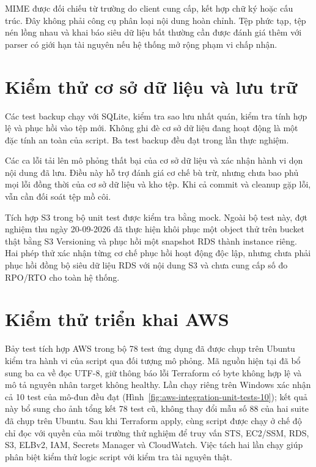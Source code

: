 MIME được đối chiếu từ trường do client cung cấp, kết hợp chữ ký hoặc cấu trúc. Đây không phải công cụ phân loại nội dung hoàn chỉnh. Tệp phức tạp, tệp nén lồng nhau và khai báo siêu dữ liệu bất thường cần được đánh giá thêm với parser có giới hạn tài nguyên nếu hệ thống mở rộng phạm vi chấp nhận.

\section{Kiểm thử cơ sở dữ liệu và lưu trữ}
Các test backup chạy với SQLite, kiểm tra sao lưu nhất quán, kiểm tra tính hợp lệ và phục hồi vào tệp mới. Không ghi đè cơ sở dữ liệu đang hoạt động là một đặc tính an toàn của script. Ba test backup đều đạt trong lần thực nghiệm.

Các ca lỗi tải lên mô phỏng thất bại của cơ sở dữ liệu và xác nhận hành vi dọn nội dung đã lưu. Điều này hỗ trợ đánh giá cơ chế bù trừ, nhưng chưa bao phủ mọi lỗi đồng thời của cơ sở dữ liệu và kho tệp. Khi cả commit và cleanup gặp lỗi, vẫn cần đối soát tệp mồ côi.

Tích hợp S3 trong bộ unit test được kiểm tra bằng mock. Ngoài bộ test này, đợt nghiệm thu ngày 20-09-2026 đã thực hiện khôi phục một object thử trên bucket thật bằng S3 Versioning và phục hồi một snapshot RDS thành instance riêng. Hai phép thử xác nhận từng cơ chế phục hồi hoạt động độc lập, nhưng chưa phải phục hồi đồng bộ siêu dữ liệu RDS với nội dung S3 và chưa cung cấp số đo RPO/RTO cho toàn hệ thống.

\section{Kiểm thử triển khai AWS}
Bảy test tích hợp AWS trong bộ 78 test ứng dụng đã được chụp trên Ubuntu kiểm tra hành vi của script qua đối tượng mô phỏng. Mã nguồn hiện tại đã bổ sung ba ca về đọc UTF-8, giữ thông báo lỗi Terraform có byte không hợp lệ và mô tả nguyên nhân target không healthy. Lần chạy riêng trên Windows xác nhận cả 10 test của mô-đun đều đạt (Hình~\ref{fig:aws-integration-unit-tests-10}); kết quả này bổ sung cho ảnh tổng kết 78 test cũ, không thay đổi mẫu số 88 của hai suite đã chụp trên Ubuntu. Sau khi Terraform apply, cùng script được chạy ở chế độ chỉ đọc với quyền của môi trường thử nghiệm để truy vấn STS, EC2/SSM, RDS, S3, ELBv2, IAM, Secrets Manager và CloudWatch. Việc tách hai lần chạy giúp phân biệt kiểm thử logic script với kiểm tra tài nguyên thật.

